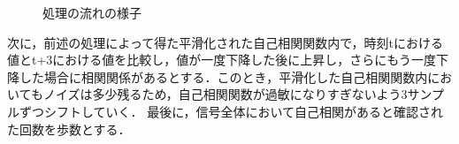 \begin{figure}[tbp]
  \caption{処理の流れの様子}
  \label{fig:jikoaa}
\end{figure}

次に，前述の処理によって得た平滑化された自己相関関数内で，時刻tにおける値とt+3における値を比較し，値が一度下降した後に上昇し，さらにもう一度下降した場合に相関関係があるとする．このとき，平滑化した自己相関関数内においてもノイズは多少残るため，自己相関関数が過敏になりすぎないよう3サンプルずつシフトしていく．
最後に，信号全体において自己相関があると確認された回数を歩数とする．